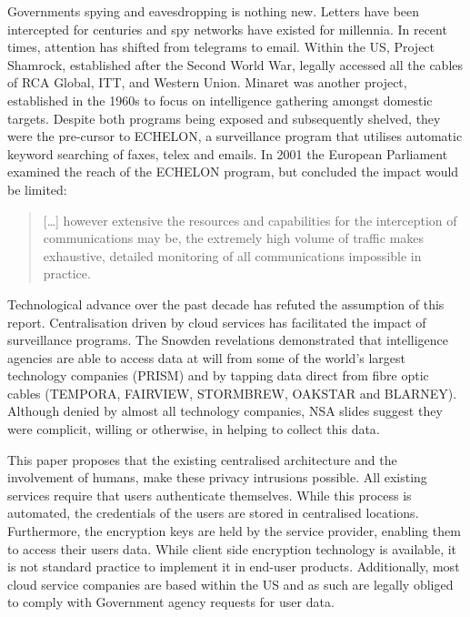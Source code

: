 \documentclass[twocolumn,english]{article}
\begin{document}
Governments spying and eavesdropping is nothing new\cite{bbc13}. Letters have been intercepted for centuries and spy networks have existed for millennia. In recent times, attention has shifted from
telegrams to email. Within the US, Project Shamrock, established after
the Second World War, legally accessed all the cables of RCA Global,
ITT, and Western Union. Minaret was another project, established in
the 1960s to focus on intelligence gathering amongst domestic targets. Despite both programs being exposed and subsequently shelved, they
were the pre-cursor to ECHELON, a surveillance program that utilises automatic
keyword searching of faxes, telex and emails.  In 2001 the European Parliament examined the reach of the ECHELON program, but concluded the impact would be limited\cite{Schmid01}: 
\begin{quote}
[\dots] however extensive the resources and capabilities for the interception of communications may be, the extremely high volume of traffic makes exhaustive, detailed monitoring of all communications impossible in practice.
\end{quote}
 
Technological advance over the past decade has refuted the assumption of this report.  Centralisation driven by cloud services has facilitated the impact of surveillance programs. The Snowden revelations demonstrated that
intelligence agencies are able to access data at will from some of
the world\textquoteright s largest technology companies (PRISM) and
by tapping data direct from fibre optic cables (TEMPORA, FAIRVIEW,
STORMBREW, OAKSTAR and BLARNEY)\cite{guardianNSA}. Although denied by almost all technology companies, NSA slides suggest
they were complicit, willing or otherwise, in helping to collect this
data\cite{guardian13}.

This paper proposes that the existing centralised architecture and the involvement of humans, make these privacy
intrusions possible. All existing services require that users authenticate themselves.  While this process is automated, the credentials
of the users are stored in centralised locations. Furthermore, the
encryption keys are held by the service provider, enabling them to
access their users data\cite{lambert12}. While client side encryption technology is available, it is not standard practice to implement it in end-user products. Additionally, most cloud service companies are based within the US and as such are legally obliged to comply with Government agency
requests for user data.
\end{document}
